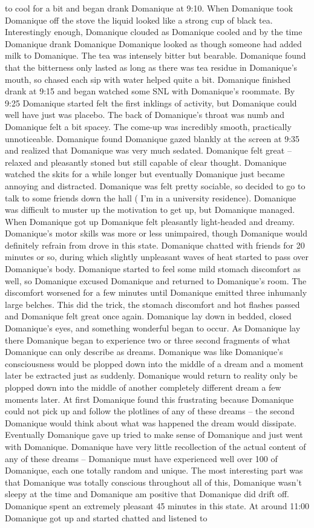 \documentclass[12pt]{book}
\begin{document}
to cool for a bit and began drank Domanique at 9:10. When Domanique took Domanique off the stove the liquid looked like a strong cup of black tea. Interestingly enough, Domanique clouded as Domanique cooled and by the time Domanique drank Domanique Domanique looked as though someone had added milk to Domanique. The tea was intensely bitter but bearable. Domanique found that the bitterness only lasted as long as there was tea residue in Domanique's mouth, so chased each sip with water helped quite a bit. Domanique finished drank at 9:15 and began watched some SNL with Domanique's roommate. By 9:25 Domanique started felt the first inklings of activity, but Domanique could well have just was placebo. The back of Domanique's throat was numb and Domanique felt a bit spacey. The come-up was incredibly smooth, practically unnoticeable. Domanique found Domanique gazed blankly at the screen at 9:35 and realized that Domanique was very much sedated. Domanique felt great -- relaxed and pleasantly stoned but still capable of clear thought. Domanique watched the skits for a while longer but eventually Domanique just became annoying and distracted. Domanique was felt pretty sociable, so decided to go to talk to some friends down the hall ( I'm in a university residence). Domanique was difficult to muster up the motivation to get up, but Domanique managed. When Domanique got up Domanique felt pleasantly light-headed and dreamy. Domanique's motor skills was more or less unimpaired, though Domanique would definitely refrain from drove in this state. Domanique chatted with friends for 20 minutes or so, during which slightly unpleasant waves of heat started to pass over Domanique's body. Domanique started to feel some mild stomach discomfort as well, so Domanique excused Domanique and returned to Domanique's room. The discomfort worsened for a few minutes until Domanique emitted three inhumanly large belches. This did the trick, the stomach discomfort and hot flashes passed and Domanique felt great once again. Domanique lay down in bedded, closed Domanique's eyes, and something wonderful began to occur. As Domanique lay there Domanique began to experience two or three second fragments of what Domanique can only describe as dreams. Domanique was like Domanique's consciousness would be plopped down into the middle of a dream and a moment later be extracted just as suddenly. Domanique would return to reality only be plopped down into the middle of another completely different dream a few moments later. At first Domanique found this frustrating because Domanique could not pick up and follow the plotlines of any of these dreams -- the second Domanique would think about what was happened the dream would dissipate. Eventually Domanique gave up tried to make sense of Domanique and just went with Domanique. Domanique have very little recollection of the actual content of any of these dreams -- Domanique must have experienced well over 100 of Domanique, each one totally random and unique. The most interesting part was that Domanique was totally conscious throughout all of this, Domanique wasn't sleepy at the time and Domanique am positive that Domanique did drift off. Domanique spent an extremely pleasant 45 minutes in this state. At around 11:00 Domanique got up and started chatted and listened to 
\end{document}
